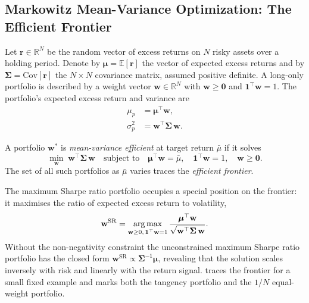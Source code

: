 \subsection{Markowitz Mean-Variance Optimization: The Efficient Frontier}
\label{sec:ch10-markowitz-mean-variance}

Let $\mathbf{r} \in \mathbb{R}^N$ be the random vector of excess returns on $N$ risky
assets over a holding period. Denote by $\boldsymbol{\mu} = \mathbb{E}[\mathbf{r}]$ the
vector of expected excess returns and by $\boldsymbol{\Sigma} = \mathrm{Cov}[\mathbf{r}]$
the $N \times N$ covariance matrix, assumed positive definite. A long-only portfolio is
described by a weight vector $\mathbf{w} \in \mathbb{R}^N$ with $\mathbf{w} \geq \mathbf{0}$
and $\mathbf{1}^\top \mathbf{w} = 1$. The portfolio's expected excess return and variance are
\begin{align}
  \mu_p &= \boldsymbol{\mu}^\top \mathbf{w}, \label{eq:ch10-port-return} \\
  \sigma_p^2 &= \mathbf{w}^\top \boldsymbol{\Sigma}\, \mathbf{w}. \label{eq:ch10-port-var}
\end{align}

\begin{definition}
\label{def:mv-efficient}
A portfolio $\mathbf{w}^*$ is \emph{mean-variance efficient} at target return
$\bar{\mu}$ if it solves
\begin{equation}
  \min_{\mathbf{w}} \; \mathbf{w}^\top \boldsymbol{\Sigma}\, \mathbf{w}
  \quad \text{subject to} \quad
  \boldsymbol{\mu}^\top \mathbf{w} = \bar{\mu}, \quad
  \mathbf{1}^\top \mathbf{w} = 1, \quad \mathbf{w} \geq \mathbf{0}.
  \label{eq:ch10-mv-program}
\end{equation}
The set of all such portfolios as $\bar{\mu}$ varies traces the \emph{efficient frontier}.
\end{definition}

The maximum Sharpe ratio portfolio occupies a special position on the frontier: it
maximises the ratio of expected excess return to volatility,
\begin{equation}
  \mathbf{w}^{\text{SR}} = \operatorname*{arg\,max}_{\mathbf{w}\geq 0,\,\mathbf{1}^\top\mathbf{w}=1}
  \frac{\boldsymbol{\mu}^\top \mathbf{w}}{\sqrt{\mathbf{w}^\top \boldsymbol{\Sigma}\, \mathbf{w}}}.
  \label{eq:ch10-sharpe-max}
\end{equation}
Without the non-negativity constraint the unconstrained maximum Sharpe ratio portfolio has
the closed form $\mathbf{w}^{\text{SR}} \propto \boldsymbol{\Sigma}^{-1}\boldsymbol{\mu}$,
revealing that the solution scales inversely with risk and linearly with the return signal.
 traces the frontier for a small fixed example and marks both the
tangency portfolio and the $1/N$ equal-weight portfolio.

